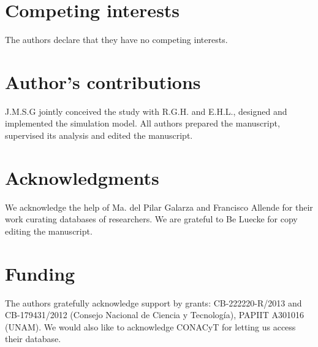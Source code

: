 \documentclass{bmcart}
\begin{document}
\begin{backmatter}

\section*{Competing interests}
  The authors declare that they have no competing interests.

\section*{Author's contributions}
    J.M.S.G jointly conceived the study with  R.G.H. and E.H.L., designed and
    implemented the simulation model. All authors prepared the manuscript,
    supervised its analysis and edited the manuscript. 

\section*{Acknowledgments}

We acknowledge the help of Ma. del Pilar Galarza and Francisco Allende
for their work curating databases of researchers. We are grateful to
Be Luecke for copy editing the manuscript.

\section*{Funding}
  The authors gratefully acknowledge support by grants: CB-222220-R/2013 and
CB-179431/2012 (Consejo Nacional de Ciencia y Tecnolog\'ia), PAPIIT A301016 (UNAM). We would also like
to acknowledge CONACyT for letting us access their database.


\end{backmatter}
\end{document}
